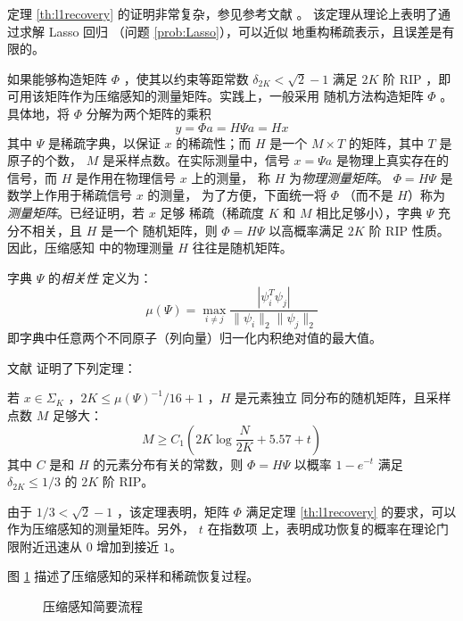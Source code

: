 定理 \ref{th:l1recovery} 的证明非常复杂，参见参考文献 \cite{RIPimplieCS}。
该定理从理论上表明了通过求解 Lasso 回归 （问题 \ref{prob:Lasso}），可以近似
地重构稀疏表示，且误差是有限的。

如果能够构造矩阵 $\Phi$ ，使其以约束等距常数 $\delta_{2K} < \sqrt{2}-1$
满足 $2K$ 阶 RIP ，即可用该矩阵作为压缩感知的测量矩阵。实践上，一般采用
随机方法构造矩阵 $\Phi$ 。具体地，将 $\Phi$ 分解为两个矩阵的乘积
\begin{equation}
y = \Phi a = H \Psi a = H x
\end{equation}
其中 $\Psi$ 是稀疏字典，以保证 $x$ 的稀疏性；而 $H$ 是一个 $M \times T$
的矩阵，其中 $T$ 是原子的个数， $M$ 是采样点数。在实际测量中，信号
$x = \Psi a$ 是物理上真实存在的信号，而 $H$ 是作用在物理信号 $x$ 上的测量，
称 $H$
为\emph{物理测量矩阵}。 $\Phi = H \Psi$ 是数学上作用于稀疏信号 $x$ 的测量，
为了方便，下面统一将 $\Phi$ （而不是 $H$）称为\emph{测量矩阵}。已经证明，若 $x$ 足够
稀疏（稀疏度 $K$ 和 $M$ 相比足够小），字典 $\Psi$ 充分不相关，且 $H$ 是一个
随机矩阵，则 $\Phi = H \Psi$ 以高概率满足 $2K$ 阶 RIP 性质。因此，压缩感知
中的物理测量 $H$ 往往是随机矩阵。
\begin{definition}[相关性]
字典 $\Psi$ 的\emph{相关性} 定义为：
\begin{equation}
\mu(\Psi) = \max_{i \neq j} \frac{|\psi_i^T \psi_j|}{\|\psi_i\|_2
\|\psi_j\|_2}
\end{equation}
即字典中任意两个不同原子（列向量）归一化内积绝对值的最大值。
\end{definition}

文献 \cite{CSRedundant} 证明了下列定理：
\begin{theorem} \label{th:RandomRIP}
若 $x \in \Sigma_K$ ，$2K \leq \mu(\Psi)^{-1}/16+1$ ，$H$ 是元素独立
同分布的随机矩阵，且采样点数 $M$ 足够大：
\begin{equation}
M \geq C_1(2K \log \frac{N}{2K} + 5.57 + t)
\end{equation}
其中 $C$ 是和 $H$ 的元素分布有关的常数，则 $\Phi = H \Psi$ 以概率
$1 - e^{-t}$ 满足 $\delta_{2K} \leq 1/3$ 的 $2K$ 阶 RIP。
\end{theorem}

由于 $1/3 < \sqrt{2} - 1$ ，该定理表明，矩阵 $\Phi$ 满足定理
\ref{th:l1recovery} 的要求，可以作为压缩感知的测量矩阵。另外， $t$ 在指数项
上，表明成功恢复的概率在理论门限附近迅速从 $0$ 增加到接近 $1$。

图 \ref{fig:CS} 描述了压缩感知的采样和稀疏恢复过程。

\begin{figure}
\centering
{} %
\caption{压缩感知简要流程}
\label{fig:CS}
\end{figure}

